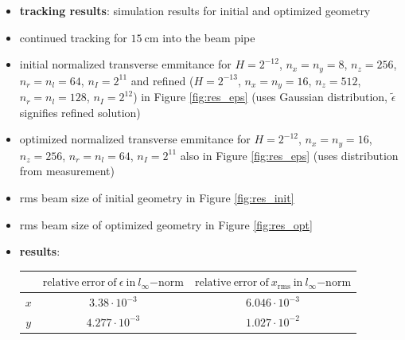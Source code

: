 %       
%       

\newpage

\begin{itemize}
   \item \textbf{tracking results}: simulation results for initial and optimized geometry
   \item continued tracking for $15\ \mathrm{cm}$ into the beam pipe
   \item initial normalized transverse emmitance for $H=2^{-12}$, $n_x=n_y=8$, $n_z=256$, $n_r=n_l=64$, $n_I=2^{11}$ and refined ($H=2^{-13}$, $n_x=n_y=16$, $n_z=512$, $n_r=n_l=128$, $n_I=2^{12}$) in Figure \ref{fig:res_eps} (uses Gaussian distribution, $\tilde{\epsilon}$ signifies refined solution)
   \item optimized normalized transverse emmitance for $H=2^{-12}$, $n_x=n_y=16$, $n_z=256$, $n_r=n_l=64$, $n_I=2^{11}$ also in Figure \ref{fig:res_eps} (uses distribution from measurement)
   \item rms beam size of initial geometry in Figure \ref{fig:res_init}
   \item rms beam size of optimized geometry in Figure \ref{fig:res_opt}
   \item \textbf{results}: \qquad
                           \begin{tabular}{c|c|c}
                              & $\mathrm{relative\ error\ of}\ \epsilon\ \mathrm{in}\ l_\infty \mathrm{-norm}$ & $\mathrm{relative\ error\ of}\ x_\mathrm{rms}\ \mathrm{in}\ l_\infty \mathrm{-norm}$ \\
                              \hline
                              $x$ & $3.38 \cdot 10^{-3}$ & $6.046 \cdot 10^{-3}$ \\
                              $y$ & $4.277 \cdot 10^{-3}$ & $1.027 \cdot 10^{-2}$ \\
                            \end{tabular}
\end{itemize}

